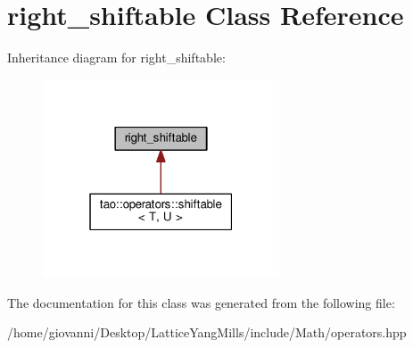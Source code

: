 \hypertarget{classright__shiftable}{}\section{right\+\_\+shiftable Class Reference}
\label{classright__shiftable}


Inheritance diagram for right\+\_\+shiftable\+:\nopagebreak
\begin{figure}[H]
\begin{center}
\leavevmode
\includegraphics[width=199pt]{classright__shiftable__inherit__graph}
\end{center}
\end{figure}


The documentation for this class was generated from the following file\+:\begin{DoxyCompactItemize}
\item 
/home/giovanni/\+Desktop/\+Lattice\+Yang\+Mills/include/\+Math/operators.\+hpp\end{DoxyCompactItemize}
